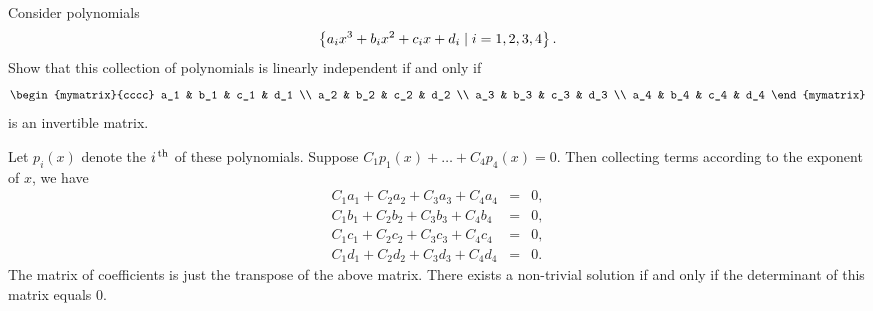 \begin{ex}
  Consider polynomials
  \begin{equation*}
    \left\{a_ix^3+b_ix^2+c_ix+d_i \mid i=1,2,3,4\right\}.
  \end{equation*}
  Show that this collection of polynomials is linearly independent if
  and only if
  \begin{equation*}
    \begin{mymatrix}{cccc}
      a_1 & b_1 & c_1 & d_1 \\
      a_2 & b_2 & c_2 & d_2 \\
      a_3 & b_3 & c_3 & d_3 \\
      a_4 & b_4 & c_4 & d_4
    \end{mymatrix}
  \end{equation*}
  is an invertible matrix.
  \begin{sol}
    Let $p_i(x)$ denote the $i^{\,\rm th}$ of these polynomials. Suppose
    $C_1p_1(x) + \ldots + C_4p_4(x) = 0$. Then collecting terms
    according to the exponent of $x$, we have
    \begin{eqnarray*}
      C_1 a_1 + C_2 a_2 +C_3 a_3 + C_4 a_4 &=& 0, \\
      C_1 b_1 + C_2 b_2 +C_3 b_3 + C_4 b_4 &=& 0, \\
      C_1 c_1 + C_2 c_2 +C_3 c_3 + C_4 c_4 &=& 0, \\
      C_1 d_1 + C_2 d_2 +C_3 d_3 + C_4 d_4 &=& 0.
    \end{eqnarray*}
    The matrix of coefficients is just the transpose of the above
    matrix. There exists a non-trivial solution if and only if the
    determinant of this matrix equals 0.
  \end{sol}
\end{ex}

